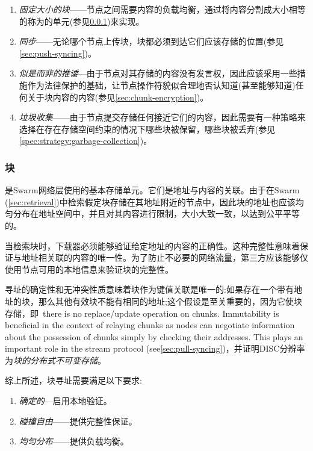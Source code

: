 \begin{enumerate}
    \item \emph{固定大小的块}——节点之间需要内容的负载均衡，通过将内容分割成大小相等的称为的单元(参见\ref{sec:chunks})来实现。
    \item \emph{同步}——无论哪个节点上传块，块都必须到达它们应该存储的位置(参见\ref{sec:push-syncing})。
    \item \emph{似是而非的推诿}—由于节点对其存储的内容没有发言权，因此应该采用一些措施作为法律保护的基础，让节点操作符貌似合理地否认知道(甚至能够知道)任何关于块内容的内容(参见\ref{sec:chunk-encryption})。
    \item \emph{垃圾收集}——由于节点提交存储任何接近它们的内容，因此需要有一种策略来选择在存在存储空间约束的情况下哪些块被保留，哪些块被丢弃(参见\ref{spec:strategy:garbage-collection})。 
\end{enumerate}

\subsubsection{块}\label{sec:chunks}

是Swarm网络层使用的基本存储单元。它们是地址与内容的关联。由于在Swarm (\ref{sec:retrieval})中检索假定块存储在其地址附近的节点中，因此块的地址也应该均匀分布在地址空间中，并且对其内容进行限制，大小大致一致，以达到公平平等的。

当检索块时，下载器必须能够验证给定地址的内容的正确性。这种完整性意味着保证与地址相关联的内容的唯一性。为了防止不必要的网络流量，第三方应该能够仅使用节点可用的本地信息来验证块的完整性。

寻址的确定性和无冲突性质意味着块作为键值关联是唯一的:如果存在一个带有地址的块，那么其他有效块不能有相同的地址;这个假设是至关重要的，因为它使块存储，即\ there is no replace/update operation on chunks. Immutability is beneficial in the context of relaying chunks as nodes can negotiate information about the possession of chunks simply by checking their addresses. This plays an important role in the stream protocol (see\ref{sec:pull-syncing})，并证明DISC分辨率为\emph{块的分布式不可变存储}。

综上所述，块寻址需要满足以下要求:

\begin{enumerate}
    \item \emph{确定的}—启用本地验证。
    \item \emph{碰撞自由}——提供完整性保证。
    \item \emph{均匀分布}——提供负载均衡。
\end{enumerate}

